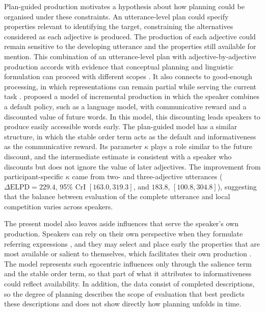 \documentclass[10pt,a4paper,fleqn]{article}
\begin{document}
Plan-guided production motivates a hypothesis about how planning could be organised under these constraints.
An utterance-level plan could specify properties relevant to identifying the target, constraining the alternatives considered as each adjective is produced.
The production of each adjective could remain sensitive to the developing utterance and the properties still available for mention.
This combination of an utterance-level plan with adjective-by-adjective production accords with evidence that conceptual planning and linguistic formulation can proceed with different scopes \citep{griffin2000eyes,ferreira2002incremental,konopka2014priming}.
It also connects to good-enough processing, in which representations can remain partial while serving the current task \citep{ferreira2002goodenough}.
\citet{futrell2023information} proposed a model of incremental production in which the speaker combines a default policy, such as a language model, with communicative reward and a discounted value of future words.
In this model, this discounting leads speakers to produce easily accessible words early.
The plan-guided model has a similar structure, in which the stable order term acts as the default and informativeness as the communicative reward.
Its parameter $\kappa$ plays a role similar to the future discount, and the intermediate estimate is consistent with a speaker who discounts but does not ignore the value of later adjectives.
The improvement from participant-specific $\kappa$ came from two- and three-adjective utterances ($\Delta\mathrm{ELPD}=229.4$, 95\% CrI $[163.0,319.3]$, and $183.8$, $[100.8,304.8]$), suggesting that the balance between evaluation of the complete utterance and local competition varies across speakers.

The present model also leaves aside influences that serve the speaker's own production.
Speakers can rely on their own perspective when they formulate referring expressions \citep{horton1996common}, and they may select and place early the properties that are most available or salient to themselves, which facilitates their own production \citep[p.~38]{fukumura2018ordering}.
The model represents such egocentric influences only through the salience term and the stable order term, so that part of what it attributes to informativeness could reflect availability.
In addition, the data consist of completed descriptions, so the degree of planning describes the scope of evaluation that best predicts these descriptions and does not show directly how planning unfolds in time.
\end{document}

